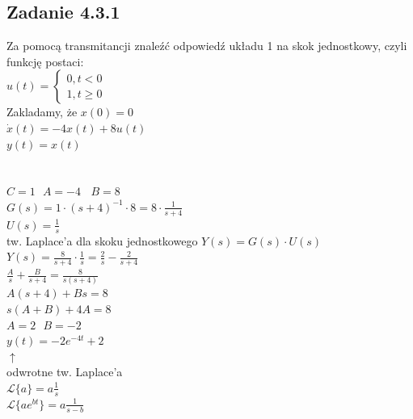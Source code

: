 \pagebreak
\subsection*{Zadanie 4.3.1} {\color{darkgray}
	Za pomocą transmitancji znaleźć odpowiedź układu 1 na skok jednostkowy, czyli funkcję postaci:\\
	$u(t)=\begin{cases}0,t<0 \\ 1, t\geqslant 0 \end{cases}$\\
	Zakladamy, że $x(0)=0$\\
	$\dot{x}(t)=-4x(t)+8u(t)$\\
	$y(t)=x(t)$\\
}\lineh
\\\\
$C=1 \ \ \ A=-4 \ \ \ \ B=8$\\
$G(s)=1 \cdot (s+4)^{-1} \cdot 8 = 8 \cdot \frac{1}{s+4}$\\
$U(s)=\frac 1 s \ \ \ $\\ tw. Laplace'a dla skoku jednostkowego
$Y(s)=G(s) \cdot U(s)$\\
$Y(s)=\frac{8}{s+4} \cdot \frac{1}{s} = \frac{2}{s} - \frac{2}{s+4}$\\
$\frac{A}{s}+\frac{B}{s+4}=\frac{8}{s(s+4)}$\\
$A(s+4)+Bs=8$\\
$s(A+B)+4A=8$\\
$A=2 \ \ \ B=-2$\\
$\boxed{y(t)=-2e^{-4t}+2}$\\ 
$\uparrow$\\
odwrotne tw. Laplace'a\\
$\mathcal{L}\{a\}=a\frac 1 s$\\
$\mathcal{L}\{ae^{bt}\}=a\frac {1}{s-b}$\\



